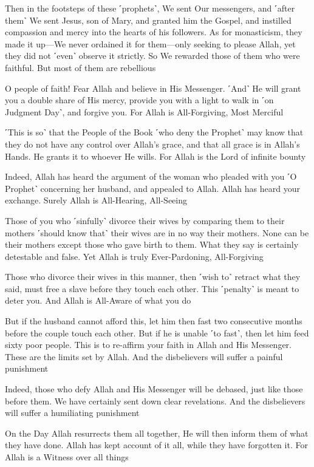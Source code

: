 Then in the footsteps of these ˹prophets˺, We sent Our messengers, and ˹after them˺ We sent Jesus, son of Mary, and granted him the Gospel, and instilled compassion and mercy into the hearts of his followers. As for monasticism, they made it up—We never ordained it for them—only seeking to please Allah, yet they did not ˹even˺ observe it strictly. So We rewarded those of them who were faithful. But most of them are rebellious

O people of faith! Fear Allah and believe in His Messenger. ˹And˺ He will grant you a double share of His mercy, provide you with a light to walk in ˹on Judgment Day˺, and forgive you. For Allah is All-Forgiving, Most Merciful

˹This is so˺ that the People of the Book ˹who deny the Prophet˺ may know that they do not have any control over Allah’s grace, and that all grace is in Allah’s Hands. He grants it to whoever He wills. For Allah is the Lord of infinite bounty

Indeed, Allah has heard the argument of the woman who pleaded with you ˹O Prophet˺ concerning her husband, and appealed to Allah. Allah has heard your exchange. Surely Allah is All-Hearing, All-Seeing

Those of you who ˹sinfully˺ divorce their wives by comparing them to their mothers ˹should know that˺ their wives are in no way their mothers. None can be their mothers except those who gave birth to them. What they say is certainly detestable and false. Yet Allah is truly Ever-Pardoning, All-Forgiving

Those who divorce their wives in this manner, then ˹wish to˺ retract what they said, must free a slave before they touch each other. This ˹penalty˺ is meant to deter you. And Allah is All-Aware of what you do

But if the husband cannot afford this, let him then fast two consecutive months before the couple touch each other. But if he is unable ˹to fast˺, then let him feed sixty poor people. This is to re-affirm your faith in Allah and His Messenger. These are the limits set by Allah. And the disbelievers will suffer a painful punishment

Indeed, those who defy Allah and His Messenger will be debased, just like those before them. We have certainly sent down clear revelations. And the disbelievers will suffer a humiliating punishment

On the Day Allah resurrects them all together, He will then inform them of what they have done. Allah has kept account of it all, while they have forgotten it. For Allah is a Witness over all things


